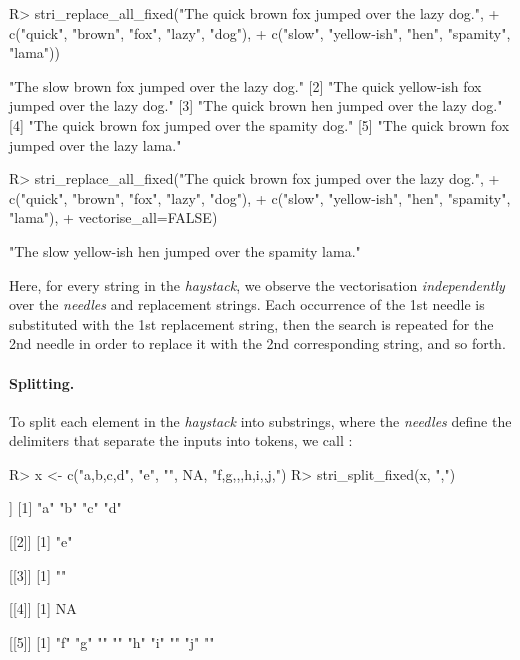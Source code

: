 \documentclass[nojss]{jss}
\begin{document}
\begin{Schunk}
\begin{Sinput}
R> stri_replace_all_fixed("The quick brown fox jumped over the lazy dog.",
+      c("quick", "brown",      "fox", "lazy",    "dog"),
+      c("slow",  "yellow-ish", "hen", "spamity", "lama"))
\end{Sinput}
\begin{Soutput}
[1] "The slow brown fox jumped over the lazy dog."
[2] "The quick yellow-ish fox jumped over the lazy dog."
[3] "The quick brown hen jumped over the lazy dog."
[4] "The quick brown fox jumped over the spamity dog."
[5] "The quick brown fox jumped over the lazy lama."
\end{Soutput}
\begin{Sinput}
R> stri_replace_all_fixed("The quick brown fox jumped over the lazy dog.",
+      c("quick", "brown",      "fox", "lazy", "dog"),
+      c("slow",  "yellow-ish", "hen", "spamity", "lama"),
+      vectorise_all=FALSE)
\end{Sinput}
\begin{Soutput}
[1] "The slow yellow-ish hen jumped over the spamity lama."
\end{Soutput}
\end{Schunk}

\noindent
Here, for every string in the \textit{haystack}, we observe the vectorisation
\textit{independently} over the \textit{needles} and replacement strings.
Each occurrence of the 1st needle is substituted with the 1st replacement string,
then the search is repeated for the 2nd needle in order to replace it with the 2nd corresponding string, and so forth.


\paragraph{Splitting.}
To  split each element in the \textit{haystack} into substrings,
where the \textit{needles} define the delimiters that separate the inputs into tokens,
we call :

\begin{Schunk}
\begin{Sinput}
R> x <- c("a,b,c,d", "e", "", NA, "f,g,,,h,i,,j,")
R> stri_split_fixed(x, ",")
\end{Sinput}
\begin{Soutput}
[[1]]
[1] "a" "b" "c" "d"

[[2]]
[1] "e"

[[3]]
[1] ""

[[4]]
[1] NA

[[5]]
[1] "f" "g" ""  ""  "h" "i" ""  "j" ""
\end{Soutput}
\end{Schunk}
\end{document}
